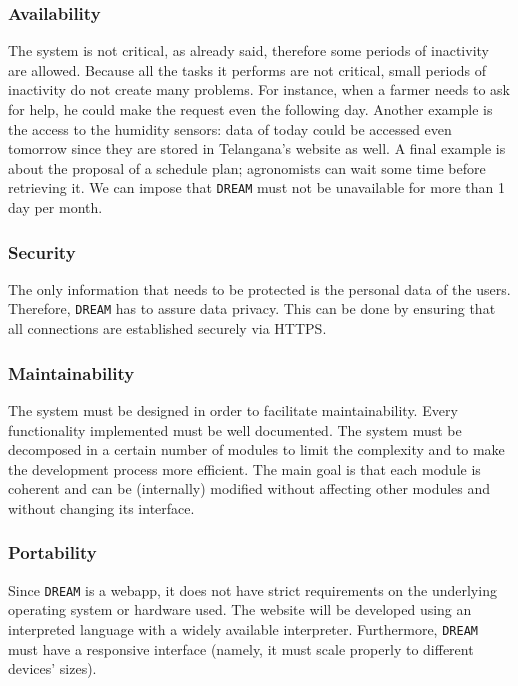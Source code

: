\documentclass{article}
\begin{document}
\subsubsection{Availability}
The system is not critical, as already said, therefore some periods of inactivity are allowed. Because all the tasks it performs are not critical, small periods of inactivity do not create many problems. For instance, when a farmer needs to ask for help, he could make the request even the following day. Another example is the access to the humidity sensors: data of today could be accessed even tomorrow since they are stored in Telangana’s website as well. A final example is about the proposal of a schedule plan; agronomists can wait some time before retrieving it. 
We can impose that \verb|DREAM| must not be unavailable for more than 1 day per month.
\subsubsection{Security}
The only information that needs to be protected is the personal data of the users. Therefore, \verb|DREAM| has to assure data privacy. This can be done by ensuring that all connections are established securely via HTTPS.
\subsubsection{Maintainability}
The system must be designed in order to facilitate maintainability. Every functionality implemented must be well documented. The system must be decomposed in a certain number of modules to limit the complexity and to make the development process more efficient. The main goal is that each module is coherent and can be (internally) modified without affecting other modules and without changing its interface.
\subsubsection{Portability}
Since \verb|DREAM| is a webapp, it does not have strict requirements on the underlying operating system or hardware used. The website will be developed using an interpreted language with a widely available interpreter. Furthermore, \verb|DREAM| must have a responsive interface (namely, it must scale properly to different devices’ sizes).
\newpage
\end{document}
